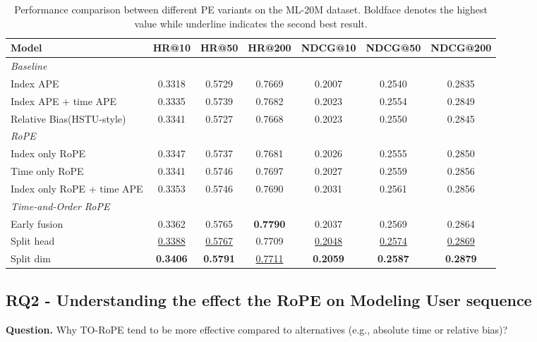 \documentclass[sigconf]{acmart}
\begin{document}
\begin{table}[htbp]
\centering
\caption{Performance comparison between different PE variants on the ML-20M dataset. Boldface denotes the highest value while underline indicates the second best result.}
\label{tab:pe_variants_ml20m}
\renewcommand{\arraystretch}{1.2} %
\begin{tabular}{l|cccccc}
\hline
\textbf{Model} & \textbf{HR@10} & \textbf{HR@50} & \textbf{HR@200} & \textbf{NDCG@10} & \textbf{NDCG@50} & \textbf{NDCG@200} \\
\hline

\textit{Baseline} & & & & & & \\
Index APE & 0.3318 & 0.5729 & 0.7669 & 0.2007 & 0.2540 & 0.2835 \\
Index APE + time APE & 0.3335 & 0.5739 & 0.7682 & 0.2023 & 0.2554 & 0.2849 \\
Relative Bias(HSTU-style) & 0.3341 & 0.5727 & 0.7668 & 0.2023 & 0.2550 & 0.2845 \\
\hline
\textit{RoPE} & & & & & & \\
Index only RoPE & 0.3347 & 0.5737 & 0.7681 & 0.2026 & 0.2555 & 0.2850 \\
Time only RoPE & 0.3341 & 0.5746 & 0.7697 & 0.2027 & 0.2559 & 0.2856 \\
Index only RoPE + time APE & 0.3353 & 0.5746 & 0.7690 & 0.2031 & 0.2561 & 0.2856 \\
\hline

\textit{Time-and-Order RoPE} & & & & & & \\
Early fusion & 0.3362 & 0.5765 & \textbf{0.7790} & 0.2037 & 0.2569 & 0.2864 \\
Split head & \underline{0.3388} & \underline{0.5767} & 0.7709 & \underline{0.2048} & \underline{0.2574} & \underline{0.2869} \\
Split dim & \textbf{0.3406} & \textbf{0.5791} & \underline{0.7711} & \textbf{0.2059} & \textbf{0.2587} & \textbf{0.2879} \\
\hline
\end{tabular}
\end{table}

\subsection{RQ2 - Understanding the effect the RoPE on Modeling User sequence}
\textbf{Question.} Why TO-RoPE tend to be more effective compared to alternatives (e.g., absolute time or relative bias)?
\end{document}
